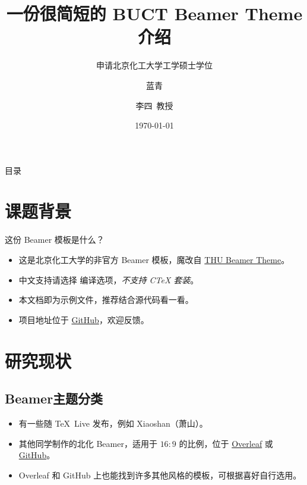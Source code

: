\documentclass[no-math]{ctexbeamer}
\author[蓝青]{蓝青 \and 李四~教授}
\title{一份很简短的 BUCT Beamer Theme 介绍}
\subtitle{申请北京化工大学工学硕士学位}
\institute[CMSE of BUCT]{北京化工大学\quad 材料科学与工程学院}
\date{\today}
\begin{document}
\maketitle

\begin{frame}{目录}
    \tableofcontents[
        sectionstyle = show,
        subsectionstyle = show/shaded/hide,
        subsubsectionstyle = show/shaded/hide
    ]
\end{frame}


\section{课题背景}

\begin{frame}{这份 Beamer 模板是什么？}
    \begin{itemize}[<+-| alert@+>] %
        \item 这是北京化工大学的非官方 Beamer 模板，魔改自 \href{https://www.overleaf.com/latex/templates/thu-beamer-theme/vwnqmzndvwyb}{THU Beamer Theme}。
        \item 中文支持请选择 \XeLaTeX 编译选项，\emph{不支持 CTeX 套装}。
        \item 本文档即为示例文件，推荐结合源代码看一看。
        \item 项目地址位于 \href{https://github.com/Miracle0565/buct-Beamer-Theme}{GitHub}，欢迎反馈。
    \end{itemize}
\end{frame}


\section{研究现状}

\subsection{Beamer主题分类}

\begin{frame}
    \begin{itemize}
        \item 有一些随 \TeX\ Live 发布，例如 Xiaoshan（萧山）。\pause
        \item 其他同学制作的北化 Beamer，适用于 $16:9$ 的比例，位于 \href{https://cn.overleaf.com/latex/templates/beamer-for-buct/rndypbwvfxrp}{Overleaf} 或 \href{https://github.com/Livioni/Beamer-Temlate-for-BUCT}{GitHub}。\pause
        \item Overleaf 和 GitHub 上也能找到许多其他风格的模板，可根据喜好自行选用。
    \end{itemize}
\end{frame}
\end{document}
